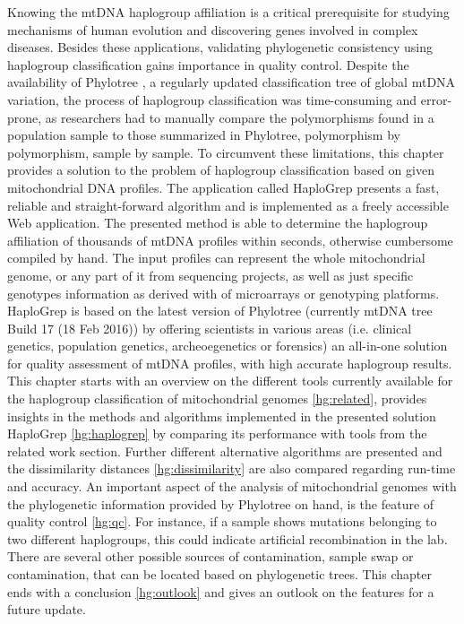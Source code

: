 Knowing the mtDNA haplogroup affiliation is a critical prerequisite \cite{Kloss-Brandstatter2011} for studying mechanisms of human evolution and discovering genes involved in complex diseases. Besides these applications, validating phylogenetic consistency using haplogroup classification gains importance in quality control. Despite the availability of Phylotree \cite{VanOven2009}, a regularly updated classification tree of global mtDNA variation, the process of haplogroup classification was time-consuming and error-prone, as researchers had to manually compare the polymorphisms found in a population sample to those summarized in Phylotree, polymorphism by polymorphism, sample by sample. To circumvent these limitations, this chapter provides a solution to the problem of haplogroup classification based on given mitochondrial DNA profiles. The application called HaploGrep presents a fast, reliable and straight-forward algorithm and is implemented as a freely accessible Web application. The presented method is able to determine the haplogroup affiliation of thousands of mtDNA profiles within seconds, otherwise cumbersome compiled by hand. The input profiles can represent the whole mitochondrial genome, or any part of it from sequencing projects, as well as just specific genotypes information as derived with of microarrays or genotyping platforms. HaploGrep is based on the latest version of Phylotree (currently mtDNA tree Build 17 (18 Feb 2016)) by offering scientists in various areas (i.e. clinical genetics, population genetics, archeoegenetics or forensics) an all-in-one solution for quality assessment of mtDNA profiles, with high accurate haplogroup results. \\
This chapter starts with an overview on the different tools currently available for the haplogroup classification of mitochondrial genomes \ref{hg:related}, provides insights in the methods and algorithms implemented in the presented solution HaploGrep \ref{hg:haplogrep} by comparing its performance with tools from the related work section. Further different alternative algorithms are presented and the dissimilarity distances \ref{hg:dissimilarity} are also compared regarding run-time and accuracy. An important aspect of the analysis of mitochondrial genomes with the phylogenetic information provided by Phylotree on hand, is the feature of quality control \ref{hg:qc}. For instance, if a sample shows mutations belonging to two different haplogroups, this could indicate artificial recombination in the lab. There are several other possible sources of contamination, sample swap or contamination, that can be located based on phylogenetic trees. This chapter ends with a conclusion \ref{hg:outlook} and gives an outlook on the features for a future update.  
